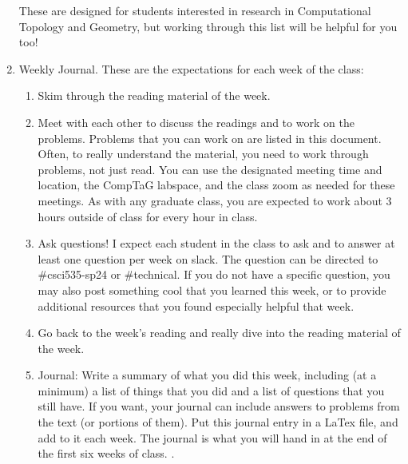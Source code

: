 \documentclass{article}
\begin{document}
\begin{enumerate}
        These are designed for students interested in research in Computational
        Topology and Geometry, but working through this list will be helpful for
        you too!
    \item Weekly Journal.
        These are the expectations for each week of the class:
        \begin{enumerate}
            \item Skim through the reading material of the week.
            \item Meet with each other to discuss the readings and to work on the
                problems.  Problems that you can work on are listed in this document.
                Often, to really understand the material, you need to work through
                problems, not just read. You can use the designated meeting time and
                location, the CompTaG labspace, and the class zoom as needed for these
                meetings. As with any graduate class, you are expected to work about 3
                hours outside of class for every hour in class.
            \item Ask questions! I expect each student in the class to ask and to answer
                at least one question per week on slack.  The question can be directed
                to \#csci535-sp24 or \#technical. If you do not have a specific question,
                you may also post something cool that you learned this week, or to
                provide additional resources that you found especially helpful that
                week.
            \item Go back to the week's reading and really dive into the reading
                material of the week.
            \item Journal: Write a summary of what you did this week, including (at a
                minimum) a list of things that you did and a list of questions that you
                still have. If you want, your journal can include
                answers to problems from the text (or portions of them).  Put
                this journal entry in a LaTex file, and add to it each week.  The
                journal is what you will hand in at the end of the first six weeks of
                class.  \color{blue}{\bf At the end of your journal, please provide two to four
                questions about computational topology that you have at this point.
                These questions should be in blue}.
        \end{enumerate}
\end{enumerate}
\end{document}
